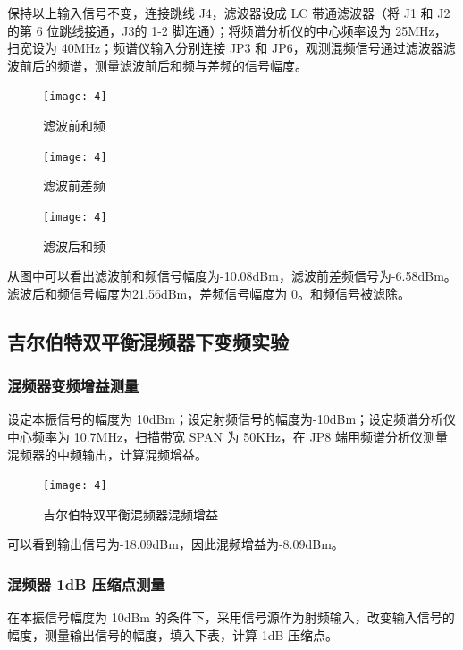 \documentclass{../source/Experiment}
\begin{document}
保持以上输入信号不变，连接跳线 J4，滤波器设成 LC 带通滤波器（将 J1 和 J2 的第 6 位跳线接通，J3的 1-2 脚连通）；将频谱分析仪的中心频率设为 25MHz，扫宽设为 40MHz；频谱仪输入分别连接 JP3 和 JP6，观测混频信号通过滤波器滤波前后的频谱，测量滤波前后和频与差频的信号幅度。

\begin{figure}[H]
    \centering
    \texttt{[image: 4]}
    \caption{滤波前和频}
\end{figure}

\begin{figure}[H]
    \centering
    \texttt{[image: 4]}
    \caption{滤波前差频}
\end{figure}

\begin{figure}[H]
    \centering
    \texttt{[image: 4]}
    \caption{滤波后和频}
\end{figure}

从图中可以看出滤波前和频信号幅度为-10.08dBm，滤波前差频信号为-6.58dBm。滤波后和频信号幅度为21.56dBm，差频信号幅度为 0。和频信号被滤除。

\subsection{吉尔伯特双平衡混频器下变频实验}
\subsubsection{混频器变频增益测量}
设定本振信号的幅度为 10dBm；设定射频信号的幅度为-10dBm；设定频谱分析仪中心频率为 10.7MHz，扫描带宽 SPAN 为 50KHz，在 JP8 端用频谱分析仪测量混频器的中频输出，计算混频增益。

\begin{figure}[H]
    \centering
    \texttt{[image: 4]}
    \caption{吉尔伯特双平衡混频器混频增益}
\end{figure}

可以看到输出信号为-18.09dBm，因此混频增益为-8.09dBm。

\subsubsection{混频器 1dB 压缩点测量}

在本振信号幅度为 10dBm 的条件下，采用信号源作为射频输入，改变输入信号的幅度，测量输出信号的幅度，填入下表，计算 1dB 压缩点。
\end{document}
